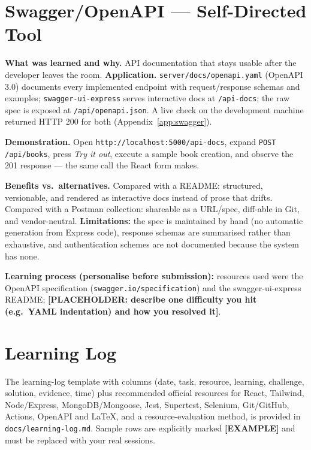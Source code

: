 \documentclass[12pt,a4paper]{article}
\newcommand{\placeholder}[1]{\textbf{[PLACEHOLDER: #1]}}
\begin{document}
\section{Swagger/OpenAPI — Self-Directed Tool}
\textbf{What was learned and why.} API documentation that stays usable
after the developer leaves the room. \textbf{Application.}
\texttt{server/docs/openapi.yaml} (OpenAPI 3.0) documents every implemented
endpoint with request/response schemas and examples; \texttt{swagger-ui-express}
serves interactive docs at \texttt{/api-docs}; the raw spec is exposed at
\texttt{/api/openapi.json}. A live check on the development machine returned
HTTP 200 for both (Appendix~\ref{app:swagger}).

\textbf{Demonstration.} Open \texttt{http://localhost:5000/api-docs},
expand \texttt{POST /api/books}, press \emph{Try it out}, execute a sample
book creation, and observe the 201 response — the same call the React form
makes.

\textbf{Benefits vs.\ alternatives.} Compared with a README: structured,
versionable, and rendered as interactive docs instead of prose that drifts.
Compared with a Postman collection: shareable as a URL/spec, diff-able in
Git, and vendor-neutral. \textbf{Limitations:} the spec is maintained by
hand (no automatic generation from Express code), response schemas are
summarised rather than exhaustive, and authentication schemes are not
documented because the system has none.

\textbf{Learning process (personalise before submission):} resources used
were the OpenAPI specification (\texttt{swagger.io/specification}) and the
swagger-ui-express README; \placeholder{describe one difficulty you hit
(e.g.\ YAML indentation) and how you resolved it}.

\section{Learning Log}
The learning-log template with columns (date, task, resource, learning,
challenge, solution, evidence, time) plus recommended official resources for
React, Tailwind, Node/Express, MongoDB/Mongoose, Jest, Supertest, Selenium,
Git/GitHub, Actions, OpenAPI and LaTeX, and a resource-evaluation method, is
provided in \texttt{docs/learning-log.md}. Sample rows are explicitly marked
\textbf{[EXAMPLE]} and must be replaced with your real sessions.
\end{document}
